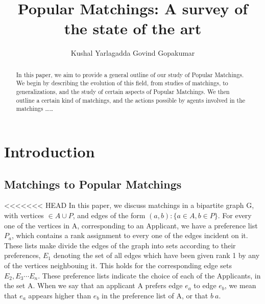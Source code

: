 \documentclass{llncs}
\begin{document}
\title{Popular Matchings: A survey of the state of the art}



\author{Kushal Yarlagadda  Govind Gopakumar}







\maketitle

\begin{abstract}
In this paper, we aim to provide a general outline of our study of Popular Matchings. We begin by describing the evolution of this field, from studies of matchings, to generalizations, and the study of certain aspects of Popular Matchings. We then outline a certain kind of matchings, and the actions possible by agents involved in the matchings \ldots\ldots
\end{abstract}

\section{Introduction}
\subsection{Matchings to Popular Matchings}

<<<<<<< HEAD
In this paper, we discuss  matchings in a bipartite graph G, with vertices $\in A\cup P$, and edges of the form $(a,b):\lbrace a \in A, b \in P\rbrace$. For every one of the vertices in A, corresponding to an Applicant, we have a preference list $P_a$, which contains a rank assignment to every one of the edges incident on it. These lists make divide the edges of the graph into sets according to their preferences, $E_1$ denoting the set of all edges which have been given rank 1 by any of the vertices neighbouing it. This holds for the corresponding edge sets $E_2, E_3 \cdots E_n$. These preference lists indicate the choice of each of the Applicants, in the set A. When we say that an applicant A prefers edge $e_a$ to edge $e_b$, we mean that $e_a$ appears higher than $e_b$  in the preference list of A, or that $b \> a$.  
\end{document}
